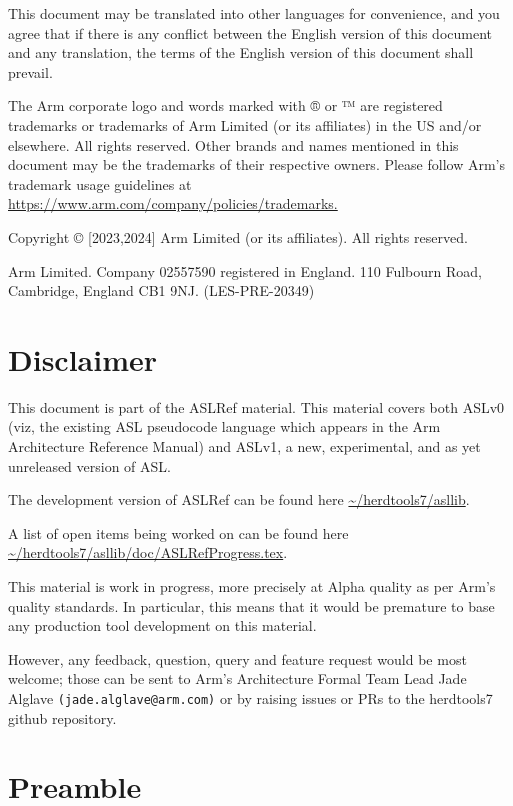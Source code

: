 \documentclass{book}
\begin{document}
This document may be translated into other languages for convenience, and you
agree that if there is any conflict between the English version of this
document and any translation, the terms of the English version of this document
shall prevail.
 
The Arm corporate logo and words marked with ® or ™ are registered trademarks
or trademarks of Arm Limited (or its affiliates) in the US and/or elsewhere.
All rights reserved.  Other brands and names mentioned in this document may be
the trademarks of their respective owners. Please follow Arm’s trademark usage
guidelines at \url{https://www.arm.com/company/policies/trademarks.}

Copyright © [2023,2024] Arm Limited (or its affiliates). All rights reserved. 
 
Arm Limited. Company 02557590 registered in England.  110 Fulbourn Road,
Cambridge, England CB1 9NJ.  (LES-PRE-20349)


\chapter{Disclaimer}

This document is part of the ASLRef material. This material covers both ASLv0
(viz, the existing ASL pseudocode language which appears in the Arm
Architecture Reference Manual) and ASLv1, a new, experimental, and as yet
unreleased version of ASL.

The development version of ASLRef can be found here \url{~/herdtools7/asllib}.

A list of open items being worked on can be found here
\url{~/herdtools7/asllib/doc/ASLRefProgress.tex}.

This material is work in progress, more precisely at Alpha quality as
per Arm’s quality standards. In particular, this means that it would be
premature to base any production tool development on this material.

However, any feedback, question, query and feature request would be most
welcome; those can be sent to Arm’s Architecture Formal Team Lead Jade
Alglave \texttt{(jade.alglave@arm.com)} or by raising issues or PRs to the herdtools7
github repository.

\chapter{Preamble}
\end{document}
